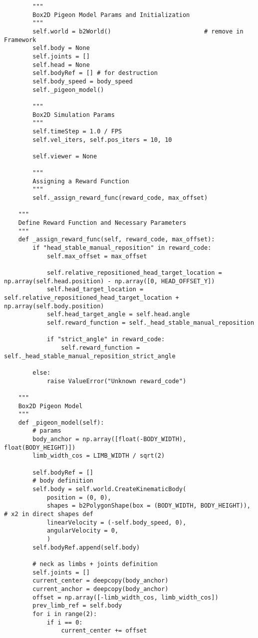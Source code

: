 \begin{lstlisting}
        """
        Box2D Pigeon Model Params and Initialization
        """
        self.world = b2World()                          # remove in Framework
        self.body = None
        self.joints = []
        self.head = None
        self.bodyRef = [] # for destruction
        self.body_speed = body_speed
        self._pigeon_model()

        """
        Box2D Simulation Params
        """
        self.timeStep = 1.0 / FPS
        self.vel_iters, self.pos_iters = 10, 10

        self.viewer = None

        """
        Assigning a Reward Function
        """
        self._assign_reward_func(reward_code, max_offset)

    """
    Define Reward Function and Necessary Parameters
    """
    def _assign_reward_func(self, reward_code, max_offset):
        if "head_stable_manual_reposition" in reward_code:
            self.max_offset = max_offset

            self.relative_repositioned_head_target_location = np.array(self.head.position) - np.array([0, HEAD_OFFSET_Y])
            self.head_target_location = self.relative_repositioned_head_target_location + np.array(self.body.position)
            self.head_target_angle = self.head.angle
            self.reward_function = self._head_stable_manual_reposition

            if "strict_angle" in reward_code:
                self.reward_function = self._head_stable_manual_reposition_strict_angle

        else:
            raise ValueError("Unknown reward_code")

    """
    Box2D Pigeon Model
    """
    def _pigeon_model(self):
        # params
        body_anchor = np.array([float(-BODY_WIDTH), float(BODY_HEIGHT)])
        limb_width_cos = LIMB_WIDTH / sqrt(2)

        self.bodyRef = []
        # body definition
        self.body = self.world.CreateKinematicBody(
            position = (0, 0),
            shapes = b2PolygonShape(box = (BODY_WIDTH, BODY_HEIGHT)), # x2 in direct shapes def
            linearVelocity = (-self.body_speed, 0),
            angularVelocity = 0,
            )
        self.bodyRef.append(self.body)

        # neck as limbs + joints definition
        self.joints = []
        current_center = deepcopy(body_anchor)
        current_anchor = deepcopy(body_anchor)
        offset = np.array([-limb_width_cos, limb_width_cos])
        prev_limb_ref = self.body
        for i in range(2):
            if i == 0:
                current_center += offset


\end{lstlisting}
